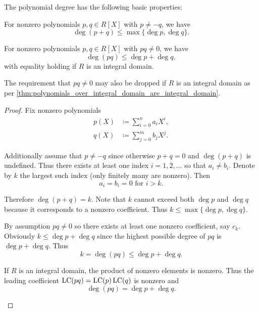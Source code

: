 \begin{proposition}\label{thm:polynomial_degree_properties}
  The polynomial degree has the following basic properties:
  \begin{thmenum}
     For nonzero polynomials \( p, q \in R[X] \) with \( p \neq -q \), we have
    \begin{equation*}
      \deg (p + q) \leq \max \{ \deg p, \deg q \}.
    \end{equation*}

     For nonzero polynomials \( p, q \in R[X] \) with \( pq \neq 0 \), we have
    \begin{equation*}
      \deg (pq) \leq \deg p + \deg q,
    \end{equation*}
    with equality holding if \( R \) is an integral domain.

    The requirement that \( pq \neq 0 \) may also be dropped if \( R \) is an integral domain as per \cref{thm:polynomials_over_integral_domain_are_integral_domain}.
  \end{thmenum}
\end{proposition}
\begin{proof}
  Fix nonzero polynomials
  \begin{align*}
    p(X) &\coloneqq \sum_{i=0}^n a_i X^i, \\
    q(X) &\coloneqq \sum_{j=0}^m b_j X^j.
  \end{align*}

  \begin{description}
     Additionally assume that \( p \neq -q \) since otherwise \( p + q = 0 \) and \( \deg(p + q) \) is undefined. Thus there exists at least one index \( i = 1, 2, \ldots \) so that \( a_i \neq b_i \). Denote by \( k \) the largest such index (only finitely many are nonzero). Then
    \begin{equation*}
      a_i = b_i = 0 \text{ for } i > k.
    \end{equation*}

    Therefore \( \deg(p + q) = k \). Note that \( k \) cannot exceed both \( \deg p \) and \( \deg q \) because it corresponds to a nonzero coefficient. Thus \( k \leq \max\{ \deg p, \deg q \} \).

     By assumption \( pq \neq 0 \) so there exists at least one nonzero coefficient, say \( c_k \). Obviously \( k \leq \deg p + \deg q \) since the highest possible degree of \( pq \) is \( \deg p + \deg q \). Thus
    \begin{equation*}
      k = \deg (pq) \leq \deg p + \deg q.
    \end{equation*}

    If \( R \) is an integral domain, the product of nonzero elements is nonzero. Thus the leading coefficient \( \operatorname{LC}(pq) = \operatorname{LC}(p)\operatorname{LC}(q) \) is nonzero and
    \begin{equation*}
      \deg(pq) = \deg p + \deg q.
    \end{equation*}
  \end{description}
\end{proof}

